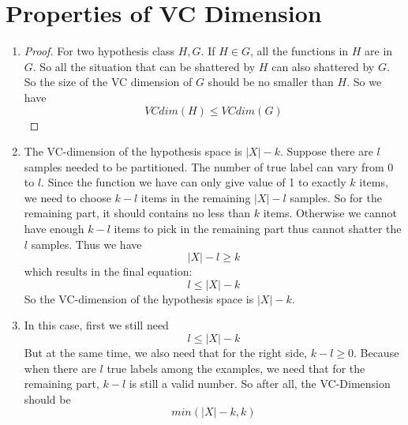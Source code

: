 \documentclass{article}
\begin{document}
	\section{Properties of VC Dimension}
		\begin{enumerate}
			\item \begin{proof}
				For two hypothesis class $H, G$. If $H \in G$, all the functions in $H$ are in $G$. So all the situation that can be shattered by $H$ can also shattered by $G$. So the size of the VC dimension of $G$ should be no smaller than $H$. So we have \begin{equation}
				VCdim(H) \leq VCdim(G)
				\end{equation} \end{proof}
			\item The VC-dimension of the hypothesis space is $|X| - k$. Suppose there are $l$ samples needed to be partitioned. The number of true label can vary from $0$ to $l$. Since the function we have can only give value of 1 to exactly $k$ items, we need to choose $k - l$ items in the remaining $|X| - l$ samples. So for the remaining part, it should contains no less than $k$ items. Otherwise we cannot have enough $k - l$ items to pick in the remaining part thus cannot shatter the $l$ samples. Thus we have \begin{displaymath}
				|X| - l \geq k
				\end{displaymath}
				which results in the final equation: \begin{equation}
					l \leq |X| - k
				\end{equation}
				So the VC-dimension of the hypothesis space is $|X| - k$.
			\item In this case, first we still need \begin{displaymath}
				l \leq |X| - k
				\end{displaymath}
				But at the same time, we also need that for the right side, $k - l \geq 0$. Because when there are $l$ true labels among the examples, we need that for the remaining part, $k - l$ is still a valid number. So after all, the VC-Dimension should be
				\begin{equation}
					min(|X|-k, k)
				\end{equation}
		\end{enumerate}
\end{document}
